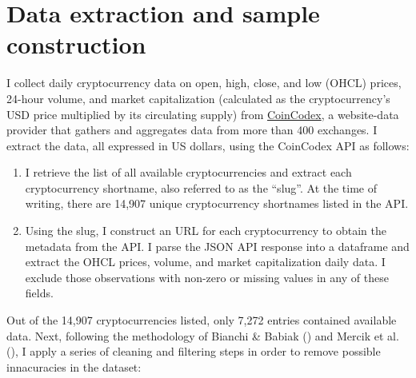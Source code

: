 \documentclass[
  12pt,
  a4paper,
  openany]{scrbook}
\begin{document}
\section{Data extraction and sample
construction}\label{data-extraction-and-sample-construction}

I collect daily cryptocurrency data on open, high, close, and low (OHCL)
prices, 24-hour volume, and market capitalization (calculated as the
cryptocurrency's USD price multiplied by its circulating supply) from
\href{https://coincodex.com/}{CoinCodex}, a website-data provider that
gathers and aggregates data from more than 400 exchanges. I extract the
data, all expressed in US dollars, using the CoinCodex API as follows:

\begin{enumerate}
\def\labelenumi{\arabic{enumi}.}
\item
  I retrieve the list of all available cryptocurrencies and extract each
  cryptocurrency shortname, also referred to as the ``slug''. At the
  time of writing, there are 14,907 unique cryptocurrency shortnames
  listed in the API.
\item
  Using the slug, I construct an URL for each cryptocurrency to obtain
  the metadata from the API. I parse the JSON API response into a
  dataframe and extract the OHCL prices, volume, and market
  capitalization daily data. I exclude those observations with non-zero
  or missing values in any of these fields.
\end{enumerate}

Out of the 14,907 cryptocurrencies listed, only 7,272 entries contained
available data. Next, following the methodology of Bianchi \& Babiak
() and Mercik
et al.
(),
I apply a series of cleaning and filtering steps in order to remove
possible innacuracies in the dataset:
\end{document}
